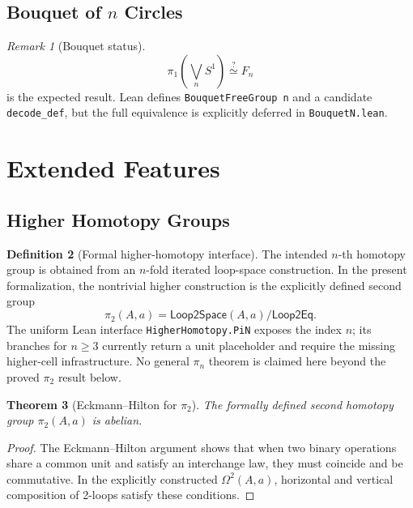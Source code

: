 \documentclass{lmcs}
\theoremstyle{definition}
\newtheorem{definition}{Definition}[section]
\theoremstyle{plain}
\newtheorem{theorem}[definition]{Theorem}
\theoremstyle{remark}
\newtheorem{remark}[definition]{Remark}
\newcommand{\piOne}{\pi_1}
\newcommand{\piTwo}{\pi_2}
\newcommand{\Sone}{S^1}
\begin{document}
\subsection{Bouquet of \texorpdfstring{$n$}{n} Circles}

\begin{remark}[Bouquet status]
\[
\piOne(\bigvee_n \Sone) \stackrel{?}{\simeq} F_n
\]
is the expected result.  Lean defines \texttt{BouquetFreeGroup n} and a
candidate \texttt{decode\_def}, but the full equivalence is explicitly deferred
in \texttt{BouquetN.lean}.
\end{remark}

\section{Extended Features}
\label{sec:extended}

\subsection{Higher Homotopy Groups}

\begin{definition}[Formal higher-homotopy interface]
The intended $n$-th homotopy group is obtained from an $n$-fold iterated
loop-space construction. In the present formalization, the nontrivial higher
construction is the explicitly defined second group
\[
\piTwo(A,a)=\mathsf{Loop2Space}(A,a)/\mathsf{Loop2Eq}.
\]
The uniform Lean interface \texttt{HigherHomotopy.PiN} exposes the index $n$;
its branches for $n\geq 3$ currently return a unit placeholder and require
the missing higher-cell infrastructure. No general $\pi_n$ theorem is claimed
here beyond the proved $\pi_2$ result below.
\end{definition}

\begin{theorem}[Eckmann--Hilton for $\pi_2$]
The formally defined second homotopy group $\piTwo(A,a)$ is abelian.
\end{theorem}

\begin{proof}
The Eckmann--Hilton argument shows that when two binary operations share a
common unit and satisfy an interchange law, they must coincide and be
commutative. In the explicitly constructed $\Omega^2(A,a)$, horizontal and
vertical composition of 2-loops satisfy these conditions.
\end{proof}
\end{document}
